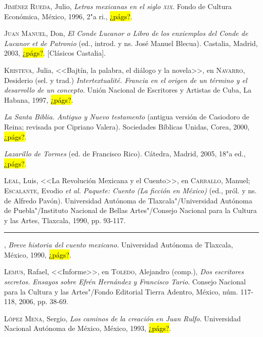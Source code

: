 \documentclass[14pt,twoside,final]{extbook} %
\begin{document}
\textsc{Jiménez Rueda}, Julio, \emph{Letras mexicanas en el siglo \textsc{xix}}. Fondo de Cultura Económica, México, 1996, 2"a ri., \hl{¿págs?}.\label{bib:jimenez1996}

\textsc{Juan Manuel}, Don, \emph{El Conde Lucanor o Libro de los enxiemplos del Conde de Lucanor et de Patronio} (ed., introd. y ns. José Manuel Blecua). Castalia, Madrid, 2003, \hl{¿págs?}. [Clásicos Castalia].\label{bib:juanmanuel2003}

\textsc{Kristeva}, Julia, <<Bajtín, la palabra, el diálogo y la novela>>, en \textsc{Navarro}, Desiderio (sel. y trad.) \emph{Intertextualité. Francia en el origen de un término y el desarrollo de un concepto}. Unión Nacional de Escritores y Artistas de Cuba, La Habana, 1997, \hl{¿págs?}.\label{bib:kristeva1997}

\emph{La Santa Biblia. Antiguo y Nuevo testamento} (antigua versión de Casiodoro de Reina; revisada por Cipriano Valera). Sociedades Bíblicas Unidas, Corea, 2000, \hl{¿págs?}.\label{bib:biblia2000}

\emph{Lazarillo de Tormes} (ed. de Francisco Rico). Cátedra, Madrid, 2005, 18"a ed., \hl{¿págs?}.\label{bib:lazarillo2005}

\textsc{Leal}, Luis, <<La Revolución Mexicana y el Cuento>>, en \textsc{Carballo}, Manuel; \textsc{Escalante}, Evodio \emph{et al.} \emph{Paquete: Cuento (La ficción en México)} (ed., pról. y ns. de Alfredo Pavón). Universidad Autónoma de Tlaxcala"/Universidad Autónoma de Puebla"/Instituto Nacional de Bellas Artes"/Consejo Nacional para la Cultura y las Artes, Tlaxcala, 1990, pp. 93-117.\label{bib:leal1990a}

\rule{1cm}{0.4pt}, \emph{Breve historia del cuento mexicano}. Universidad Autónoma de Tlaxcala, México, 1990, \hl{¿págs?}.\label{bib:leal1990b}

\textsc{Lemus}, Rafael, <<Informe>>, en \textsc{Toledo}, Alejandro (comp.), \emph{Dos escritores secretos. Ensayos sobre Efrén Hernández y Francisco Tario}. Consejo Nacional para la Cultura y las Artes"/Fondo Editorial Tierra Adentro, México, núm. 117-118, 2006, pp. 38-69.\label{bib:lemus2006}

\textsc{López Mena}, Sergio, \emph{Los caminos de la creación en Juan Rulfo}. Universidad Nacional Autónoma de México, México, 1993, \hl{¿págs?}.\label{bib:lopezmena1993}
\end{document}
